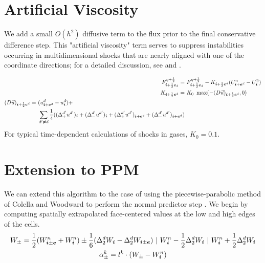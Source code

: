 \section{Artificial Viscosity}

We add a small $O(h^2)$ diffusive term to the flux prior to the final
conservative difference step.  This "artificial viscosity" term serves to
suppress instabilities occurring in multidimensional shocks that are nearly
aligned with one of the coordinate directions; for a detailed discussion,
see \cite{colellaWoodward:1984} and \cite{woodwardColella:1984}.

\begin{align*}
F^{\eta+\frac{1}{2}}_{{\boldsymbol{i}}+\frac{1}{2}{\boldsymbol{e}}_d} =& ~
    F^{\eta+\frac{1}{2}}_{{\boldsymbol{i}}+\frac{1}{2}{\boldsymbol{e}}_d}
  - K_{{\boldsymbol{i}}+\frac{1}{2}{\boldsymbol{e}}^d}(U^n_{{\boldsymbol{i}}+{\boldsymbol{e}}^d}-U^\eta_{\boldsymbol{i}})
\\
K_{{\boldsymbol{i}}+\frac{1}{2}{\boldsymbol{e}}^d} =& ~
    K_0~\max(-(D\vec{u})_{{\boldsymbol{i}}+\frac{1}{2}{\boldsymbol{e}}^d},0)
\\
\begin{split}
(D\vec{u})_{{\boldsymbol{i}}+\frac{1}{2}{\boldsymbol{e}}^d} =& ~
    (u^d_{{\boldsymbol{i}}+{\boldsymbol{e}}^d}-u^d_{\boldsymbol{i}}) +
\\
  & ~ \sum_{d'\neq d}\frac{1}{4}((\Delta^{d'}_+u^{d'})_{\boldsymbol{i}}
  + (\Delta^{d'}_-u^{d'})_{\boldsymbol{i}}
  + (\Delta^{d'}_+u^{d'})_{{\boldsymbol{i}}+{\boldsymbol{e}}^d}
  + (\Delta^{d'}_-u^{d'})_{{\boldsymbol{i}}+{\boldsymbol{e}}^d})
\end{split}
\end{align*}
For typical time-dependent calculations of shocks in gases, $K_0=0.1$.

\section{Extension to PPM}

We can extend this algorithm to the case of using the
piecewise-parabolic method of Colella and Woodward
\cite{colellaWoodward:1984} to perform the normal predictor step
\cite{millerColella:2002}. We begin by computing 
spatially extrapolated face-centered values at the low and high edges 
of the cells.
\begin{gather*}
W_\pm = \frac{1}{2} (W^n_{{\boldsymbol{i}} \pm {\boldsymbol{e}}} + W^n_{{\boldsymbol{i}}})
                      \pm \frac{1}{6} 
		      (\Delta^d_2 W_{{\boldsymbol{i}}} -
		       \Delta^d_2 W_{{\boldsymbol{i}} \pm {\boldsymbol{e}}} ) 
		      \ | \  W^n_{{\boldsymbol{i}}} - \frac{1}{2} \Delta^d_2 W_{{\boldsymbol{i}}}
		      \ | \  W^n_{{\boldsymbol{i}}} + \frac{1}{2} \Delta^d_2 W_{{\boldsymbol{i}}}
\\
\alpha^k_\pm = l^k \cdot (W_\pm - W^n_{\boldsymbol{i}})
\end{gather*}


